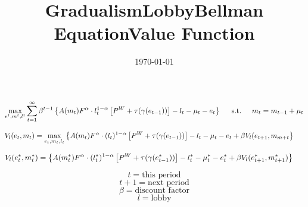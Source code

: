 \documentclass[12pt]{article}
\begin{document}
\title{\vskip-0.6in Gradualism}
\date{\today}
\maketitle

\title{Lobby}
\[
\max_{e^t,m^t,l^t} \sum_{t=1}^\infty \beta^{t-1}\left\{A(m_t)F^\alpha\cdot l^{1-\alpha}_t\left[P^W+\tau(\gamma(e_{t-1}))\right]-l_t-\mu_t-e_t
  \right\} \hskip.2in \text{s.t.} \hskip.2in  m_t=m_{t-1}+\mu_t
\]

 
\title{Bellman Equation}
\[
  V_l(e_t,m_t)=\max_{e_t,m_t,l_t}\left\{A(m_t)F^\alpha\cdot (l_t)^{1-\alpha}\left[P^W+\tau(\gamma(e_{t-1}))\right]-l_t-\mu_t-e_t+\beta V_l(e_{t+1},m_{m+t}
  \right\} \hskip.2in 
\]
\title{Value Function}
\[
  V_l(e_t^\ast,m_t^\ast)=\left\{A(m_t^\ast)F^\alpha\cdot (l^\ast_t)^{1-\alpha}\left[P^W+\tau(\gamma(e_{t-1}^\ast))\right]-l_t^\ast-\mu_t^\ast-e_t^\ast+\beta V_l(e^\ast_{t+1},m^\ast_{t+1})
  \right\} \hskip.2in
\]

\[
t=\text{this period}
\]
\[
t+1=\text{next period}
\]
\[
\beta=\text{discount factor}
\]
\[
l=\text{lobby}
\]
		
\end{document}
